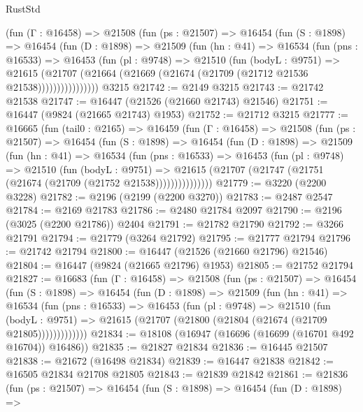 \begin{lexlean}{RustStd}
\begin{coremodule}
        (fun (Γ : @16458) =>
        @21508
          (fun (ps : @21507) =>
          @16454
            (fun (S : @1898) =>
            @16454
              (fun (D : @1898) =>
              @21509
                (fun (hn : @41) =>
                @16534
                  (fun (pns : @16533) =>
                  @16453
                    (fun (pl : @9748) =>
                    @21510
                      (fun (bodyL : @9751) =>
                      @21615
                        (@21707
                          (@21664 (@21669 (@21674 (@21709 (@21712 @21536 @21538))))))))))))))))
    @3215
@21742 := @2149 @3215
@21743 := @21742 @21538
@21747 := @16447 (@21526 (@21660 @21743) @21546)
@21751 := @16447 (@9824 (@21665 @21743) @1953)
@21752 := @21712 @3215
@21777 := @16665
    (fun (tail0 : @2165) =>
    @16459
      (fun (Γ : @16458) =>
      @21508
        (fun (ps : @21507) =>
        @16454
          (fun (S : @1898) =>
          @16454
            (fun (D : @1898) =>
            @21509
              (fun (hn : @41) =>
              @16534
                (fun (pns : @16533) =>
                @16453
                  (fun (pl : @9748) =>
                  @21510
                    (fun (bodyL : @9751) =>
                    @21615 (@21707 (@21747 (@21751 (@21674 (@21709 (@21752 @21538)))))))))))))))
@21779 := @3220 (@2200 @3228)
@21782 := @2196 (@2199 (@2200 @3270))
@21783 := @2487 @2547
@21784 := @2169 @21783
@21786 := @2480 @21784 @2097
@21790 := @2196 (@3025 (@2200 @21786)) @2404
@21791 := @21782 @21790
@21792 := @3266 @21791
@21794 := @21779 (@3264 @21792)
@21795 := @21777 @21794
@21796 := @21742 @21794
@21800 := @16447 (@21526 (@21660 @21796) @21546)
@21804 := @16447 (@9824 (@21665 @21796) @1953)
@21805 := @21752 @21794
@21827 := @16683
    (fun (Γ : @16458) =>
    @21508
      (fun (ps : @21507) =>
      @16454
        (fun (S : @1898) =>
        @16454
          (fun (D : @1898) =>
          @21509
            (fun (hn : @41) =>
            @16534
              (fun (pns : @16533) =>
              @16453
                (fun (pl : @9748) =>
                @21510
                  (fun (bodyL : @9751) =>
                  @21615 (@21707 (@21800 (@21804 (@21674 (@21709 @21805)))))))))))))
@21834 := @18108 (@16947 (@16696 (@16699 (@16701 @492 @16704)) @16486))
@21835 := @21827 @21834
@21836 := @16445 @21507
@21838 := @21672 (@16498 @21834)
@21839 := @16447 @21838
@21842 := @16505 @21834 @21708 @21805
@21843 := @21839 @21842
@21861 := @21836
    (fun (ps : @21507) =>
    @16454
      (fun (S : @1898) =>
      @16454
        (fun (D : @1898) =>

\end{coremodule}
\end{lexlean}
